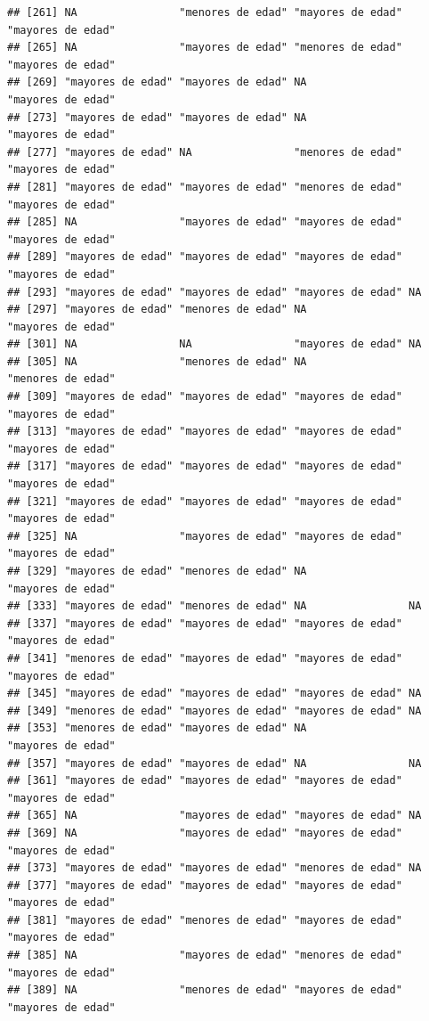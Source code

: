 \documentclass[11pt,]{book}
\begin{document}
\begin{verbatim}
## [261] NA                "menores de edad" "mayores de edad" "mayores de edad"
## [265] NA                "mayores de edad" "menores de edad" "mayores de edad"
## [269] "mayores de edad" "mayores de edad" NA                "mayores de edad"
## [273] "mayores de edad" "mayores de edad" NA                "mayores de edad"
## [277] "mayores de edad" NA                "menores de edad" "mayores de edad"
## [281] "mayores de edad" "mayores de edad" "menores de edad" "mayores de edad"
## [285] NA                "mayores de edad" "mayores de edad" "mayores de edad"
## [289] "mayores de edad" "mayores de edad" "mayores de edad" "mayores de edad"
## [293] "mayores de edad" "mayores de edad" "mayores de edad" NA               
## [297] "mayores de edad" "menores de edad" NA                "mayores de edad"
## [301] NA                NA                "mayores de edad" NA               
## [305] NA                "menores de edad" NA                "menores de edad"
## [309] "mayores de edad" "mayores de edad" "mayores de edad" "mayores de edad"
## [313] "mayores de edad" "mayores de edad" "mayores de edad" "mayores de edad"
## [317] "mayores de edad" "mayores de edad" "mayores de edad" "mayores de edad"
## [321] "mayores de edad" "mayores de edad" "mayores de edad" "mayores de edad"
## [325] NA                "mayores de edad" "mayores de edad" "mayores de edad"
## [329] "mayores de edad" "menores de edad" NA                "mayores de edad"
## [333] "mayores de edad" "menores de edad" NA                NA               
## [337] "mayores de edad" "mayores de edad" "mayores de edad" "mayores de edad"
## [341] "menores de edad" "mayores de edad" "mayores de edad" "mayores de edad"
## [345] "mayores de edad" "mayores de edad" "mayores de edad" NA               
## [349] "menores de edad" "mayores de edad" "mayores de edad" NA               
## [353] "menores de edad" "mayores de edad" NA                "mayores de edad"
## [357] "mayores de edad" "mayores de edad" NA                NA               
## [361] "mayores de edad" "mayores de edad" "mayores de edad" "mayores de edad"
## [365] NA                "mayores de edad" "mayores de edad" NA               
## [369] NA                "mayores de edad" "mayores de edad" "mayores de edad"
## [373] "mayores de edad" "mayores de edad" "menores de edad" NA               
## [377] "mayores de edad" "mayores de edad" "mayores de edad" "mayores de edad"
## [381] "mayores de edad" "menores de edad" "mayores de edad" "mayores de edad"
## [385] NA                "mayores de edad" "menores de edad" "mayores de edad"
## [389] NA                "menores de edad" "mayores de edad" "mayores de edad"

\end{verbatim}
\end{document}
